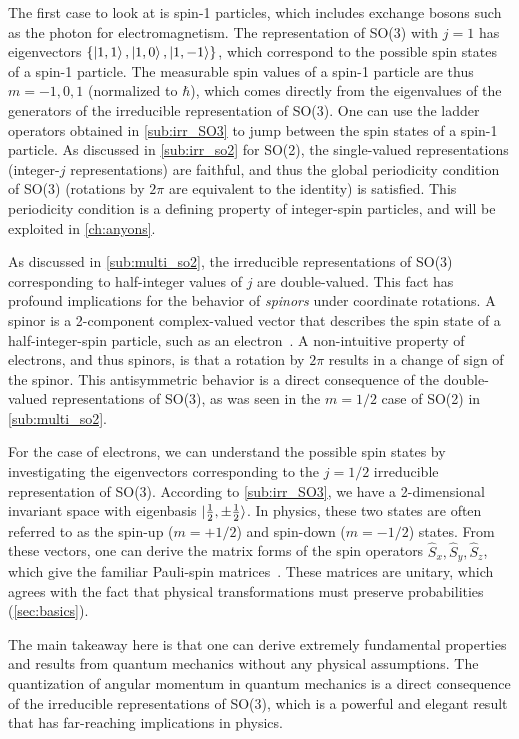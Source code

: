 The first case to look at is spin-1 particles, which includes exchange bosons such as the photon for electromagnetism. The representation of SO(3) with $j=1$ has eigenvectors $\left\{ \ket{1,1}, \ket{1,0}, \ket{1,-1} \right\}$, which correspond to the possible spin states of a spin-1 particle. The measurable spin values of a spin-1 particle are thus $m=-1,0,1$ (normalized to $\hbar$), which comes directly from the eigenvalues of the generators of the irreducible representation of SO(3). One can use the ladder operators obtained in \cref{sub:irr_SO3} to jump between the spin states of a spin-1 particle. As discussed in \cref{sub:irr_so2} for SO(2), the single-valued representations (integer-$j$ representations) are faithful, and thus the global periodicity condition of SO(3) (rotations by $2\pi$ are equivalent to the identity) is satisfied. This periodicity condition is a defining property of integer-spin particles, and will be exploited in \cref{ch:anyons}.

As discussed in \cref{sub:multi_so2}, the irreducible representations of SO(3) corresponding to half-integer values of $j$ are double-valued. This fact has profound implications for the behavior of \textit{spinors} under coordinate rotations. A spinor is a 2-component complex-valued vector that describes the spin state of a half-integer-spin particle, such as an electron~\cite{Griffiths2018}. A non-intuitive property of electrons, and thus spinors, is that a rotation by $2\pi$ results in a change of sign of the spinor. This antisymmetric behavior is a direct consequence of the double-valued representations of SO(3), as was seen in the $m=1/2$ case of SO(2) in \cref{sub:multi_so2}.

For the case of electrons, we can understand the possible spin states by investigating the eigenvectors corresponding to the $j=1/2$ irreducible representation of SO(3). According to \cref{sub:irr_SO3}, we have a 2-dimensional invariant space with eigenbasis $\ket{\frac{1}{2},\pm \frac{1}{2}}$. In physics, these two states are often referred to as the spin-up ($m=+1/2$) and spin-down ($m=-1/2$) states. From these vectors, one can derive the matrix forms of the spin operators $\hat{S}_x,\hat{S}_y,\hat{S}_z$, which give the familiar Pauli-spin matrices~\cite{Griffiths2018}. These matrices are unitary, which agrees with the fact that physical transformations must preserve probabilities (\cref{sec:basics}).

The main takeaway here is that one can derive extremely fundamental properties and results from quantum mechanics without any physical assumptions. The quantization of angular momentum in quantum mechanics is a direct consequence of the irreducible representations of SO(3), which is a powerful and elegant result that has far-reaching implications in physics.

